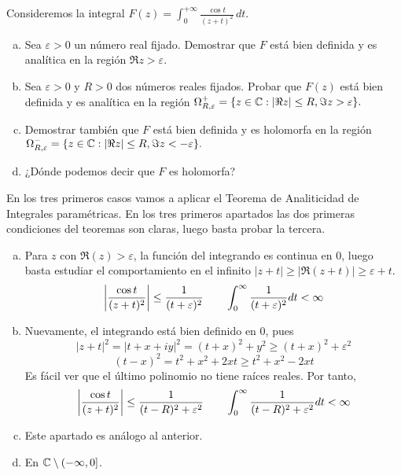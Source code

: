 \documentclass[twoside]{article}
\begin{document}
\newpage
\begin{ejercicio}{3}
Consideremos la integral 
$\displaystyle{F(z)=\int_0^{+\infty}\frac{\cos t}{(z+t)^2}\,dt}$.
\begin{enumerate}[a)]
\item Sea $\varepsilon>0$ un número real fijado. Demostrar que $F$  está bien definida y es analítica en la región $\Re z>\varepsilon$.
\item Sea $\varepsilon>0$ y $R>0$ dos números reales fijados. Probar que $F(z)$ está bien definida y es analítica en la región $\Omega^+_{R,\varepsilon}=\{z\in\mathbb{C}: |\Re z|\le R, \Im z>\varepsilon\}.$
\item Demostrar también que $F$ está bien definida y es holomorfa en la región\newline 
$\Omega^-_{R,\varepsilon}=\{z\in\mathbb{C}: |\Re z|\le R, \Im z<-\varepsilon\}.$
\item ¿Dónde podemos decir que $F$ es holomorfa?
\end{enumerate}
\end{ejercicio}
\begin{solucion}
En los tres primeros casos vamos a aplicar el Teorema de Analiticidad de Integrales paramétricas. En los tres primeros apartados las dos primeras condiciones del teoremas son claras, luego basta probar la tercera.
\begin{enumerate}[a)]
\item Para $z$ con $\Re(z)>\varepsilon$, la función del integrando es continua en 0, luego basta estudiar el comportamiento en el infinito $|z+t| \geq |\Re(z+t)| \geq \varepsilon+t$. 
$$
\left\lvert\frac{\cos t}{(z+t)^2}\right\rvert \leq \frac{1}{(t+\varepsilon)^2} \qquad \int_0^\infty \frac{1}{(t+\varepsilon)^2} dt < \infty
$$
\item Nuevamente, el integrando está bien definido en $0$, pues $$|z+t|^2 = |t+x + iy|^2 = (t+x)^2 + y^2 \geq (t+x)^2 + \varepsilon^2 $$
$$
(t-x)^2 = t^2 + x^2 + 2xt \geq t^2 + x^2 - 2xt  
$$
Es fácil ver que el último polinomio no tiene raíces reales. Por tanto,
$$
\left\lvert\frac{\cos t}{(z+t)^2}\right\rvert \leq \frac{1}{(t-R)^2+\varepsilon^2} \qquad \int_0^\infty \frac{1}{(t-R)^2+\varepsilon^2} dt < \infty
$$
\item Este apartado es análogo al anterior.
\item En $\mathbb{C}\setminus (-\infty,0]$.
\end{enumerate}
\end{solucion}
\end{document}
